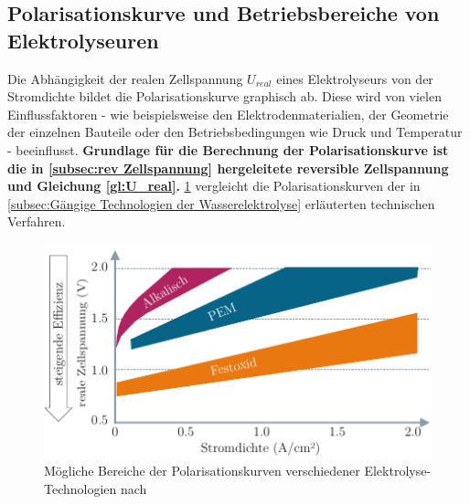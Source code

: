 \subsection{Polarisationskurve und Betriebsbereiche von Elektrolyseuren}
\label{subsec:Polarisationskurve}
Die Abhängigkeit der realen Zellspannung $U_{real}$ eines Elektrolyseurs von der Stromdichte bildet die Polarisationskurve graphisch ab. Diese wird von vielen Einflussfaktoren - wie beispielsweise den Elektrodenmaterialien, der Geometrie der einzelnen Bauteile oder den Betriebsbedingungen wie Druck und Temperatur - beeinflusst. \textbf{Grundlage für die Berechnung der Polarisationskurve ist die in \ref{subsec:rev Zellspannung} hergeleitete reversible Zellspannung und Gleichung \ref{gl:U_real}.} \ref{fig:PolarisationskurveElektrolyseure} vergleicht die Polarisationskurven der in \ref{subsec:Gängige Technologien der Wasserelektrolyse} erläuterten technischen Verfahren. 
\begin{figure}[h]
	\centering
		\includegraphics[scale=1]{Figures/PolarisationskurvenElektrolyseure}
		\caption{Mögliche Bereiche der Polarisationskurven verschiedener Elektrolyse-Technologien nach \citet{tremel_electrolysisfundamental_2018}}
\label{fig:PolarisationskurveElektrolyseure}	
\end{figure}

